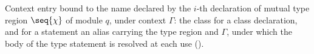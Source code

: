 Context entry bound to the name declared by the $i$-th declaration of mutual type region $\seq{\chi}$ of module $q$, under
context $\Gamma$: the class for a class declaration, and for a  statement an alias carrying the type region
and $\Gamma$, under which the body of the type statement is resolved at each use ().
